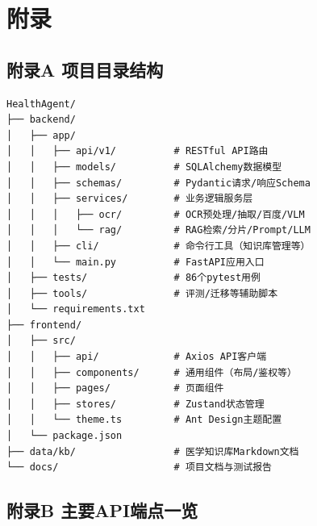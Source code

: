 \documentclass[zihao=-4,a4paper]{ctexart}
\numberwithin{figure}{section}
\numberwithin{table}{section}
\begin{document}
\section*{附\hspace{2em}录}

\subsection*{附录A 项目目录结构}

\begin{lstlisting}[basicstyle=\ttfamily\zihao{5}, numbers=none]
HealthAgent/
├── backend/
│   ├── app/
│   │   ├── api/v1/          # RESTful API路由
│   │   ├── models/          # SQLAlchemy数据模型
│   │   ├── schemas/         # Pydantic请求/响应Schema
│   │   ├── services/        # 业务逻辑服务层
│   │   │   ├── ocr/         # OCR预处理/抽取/百度/VLM
│   │   │   └── rag/         # RAG检索/分片/Prompt/LLM
│   │   ├── cli/             # 命令行工具（知识库管理等）
│   │   └── main.py          # FastAPI应用入口
│   ├── tests/               # 86个pytest用例
│   ├── tools/               # 评测/迁移等辅助脚本
│   └── requirements.txt
├── frontend/
│   ├── src/
│   │   ├── api/             # Axios API客户端
│   │   ├── components/      # 通用组件（布局/鉴权等）
│   │   ├── pages/           # 页面组件
│   │   ├── stores/          # Zustand状态管理
│   │   └── theme.ts         # Ant Design主题配置
│   └── package.json
├── data/kb/                 # 医学知识库Markdown文档
└── docs/                    # 项目文档与测试报告
\end{lstlisting}

\subsection*{附录B 主要API端点一览}
\end{document}
